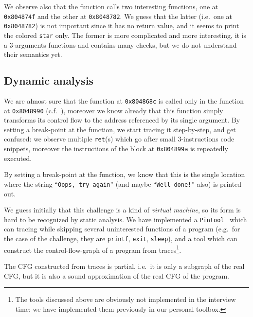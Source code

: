 \documentclass{easychair}
\begin{document}
We observe also that the function calls two interesting functions, one at \texttt{0x804874f} and the other at \texttt{0x8048782}. We guess that the latter (i.e.~one at \texttt{0x8048782}) is not important since it has no return value, and it seems to print the colored \texttt{star} only. The former is more complicated and more interesting, it is a $3$-arguments functions and contains many checks, but we do not understand their semantics yet.

\subsection{Dynamic analysis}
\label{sec:dynamic_analysis_quick}
We are almost sure that the function at \texttt{0x804868c} is called only in the function at \texttt{0x8048990} (c.f.~), moreover we know already that this function simply transforms its control flow to the address referenced by its single argument. By setting a break-point at the function, we start tracing it step-by-step, and get confused: we observe multiple \texttt{ret}(s) which go after small $3$-instructions code snippets, moreover the instructions of the block at \texttt{0x804899a} is repeatedly executed.

\begin{remark}\label{rem:print_out_location}
  By setting a break-point at the function, we know that this is the single location where the string ``\texttt{Oops, try again}'' (and maybe ``\texttt{Well done!}'' also) is printed out.
\end{remark}

We guess initially that this challenge is a kind of \emph{virtual machine}, so its form is hard to be recognized by static analysis. We have implemented a \texttt{Pintool}~\autocite{LukCMPKLWRH05} which can tracing while skipping several uninterested functions of a program (e.g.~for the case of the challenge, they are \texttt{printf}, \texttt{exit}, \texttt{sleep}), and a tool which can construct the control-flow-graph of a program from traces\footnote{The tools discussed above are obviously not implemented in the interview time: we have implemented them previously in our personal toolbox.}.

\begin{remark}
  The CFG constructed from traces is partial, i.e.~it is only a subgraph of the real CFG, but it is also a sound approximation of the real CFG of the program.
\end{remark}
\end{document}

